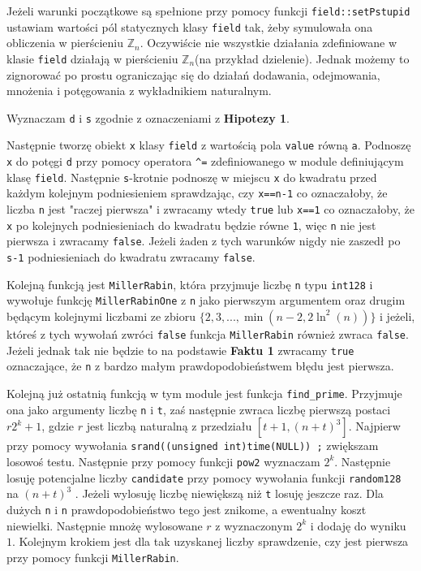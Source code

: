 \documentclass{article}
\begin{document}
Jeżeli warunki początkowe są spełnione przy pomocy funkcji \texttt{field::setPstupid} ustawiam wartości pól statycznych klasy 
\texttt{field} tak, żeby symulowała
ona obliczenia w pierścieniu $\mathbb{Z}_n$. Oczywiście nie wszystkie działania zdefiniowane
w klasie \texttt{field} działają w pierścieniu $\mathbb{Z}_n$(na przykład dzielenie). Jednak
możemy to zignorować po prostu ograniczając się do działań dodawania, odejmowania, mnożenia i potęgowania
z wykładnikiem naturalnym.

Wyznaczam \texttt{d} i \texttt{s} zgodnie z oznaczeniami z \textbf{Hipotezy 1}.

Następnie tworzę obiekt \texttt{x} klasy \texttt{field} z wartością pola \texttt{value} równą \texttt{a}.
Podnoszę \texttt{x} do potęgi \texttt{d} przy pomocy operatora \verb!^!\texttt{=} zdefiniowanego w module definiującym klasę \texttt{field}.
Następnie \texttt{s}-krotnie podnoszę w miejscu \texttt{x} do kwadratu przed każdym kolejnym podniesieniem sprawdzając, czy \texttt{x==n-1} 
co oznaczałoby, że liczba \texttt{n} jest "raczej pierwsza" i zwracamy wtedy \texttt{true} lub \texttt{x==1} co oznaczałoby, że \texttt{x} po kolejnych podniesieniach do kwadratu
będzie równe \texttt{1}, więc \texttt{n} nie jest pierwsza i zwracamy \texttt{false}. Jeżeli żaden z tych warunków nigdy nie zaszedł 
po \texttt{s-1} podniesieniach do kwadratu zwracamy \texttt{false}.

Kolejną funkcją jest \texttt{MillerRabin}, która przyjmuje liczbę \texttt{n} typu \texttt{\texttt{\textunderscore \textunderscore int128}} i 
wywołuje funkcję \texttt{MillerRabinOne} z \texttt{n} jako pierwszym argumentem oraz drugim będącym kolejnymi liczbami ze zbioru
$\{2,3,...,\min(n-2, 2\ln^2(n))\}$ i jeżeli, któreś z tych wywołań zwróci \texttt{false} funkcja \texttt{MillerRabin} również 
zwraca \texttt{false}. Jeżeli jednak tak nie będzie to na podstawie \textbf{Faktu 1} zwracamy \texttt{true} oznaczające, że 
\texttt{n} z bardzo małym prawdopodobieństwem błędu jest pierwsza. 

Kolejną już ostatnią funkcją w tym module jest funkcja \texttt{find\_prime}. Przyjmuje ona jako argumenty liczbę \texttt{n} i 
\texttt{t}, zaś następnie zwraca liczbę pierwszą postaci $r2^k+1$, gdzie $r$ jest liczbą naturalną z przedziału $[t+1,(n+t)^3]$.
Najpierw przy pomocy wywołania \texttt{srand((unsigned int)time(NULL)) ;} zwiększam losowoś testu. 
Następnie przy pomocy funkcji \texttt{pow2} wyznaczam $2^k$. Następnie losuję potencjalne liczby \texttt{candidate} przy pomocy wywołania
funkcji \texttt{random128} na $(n+t)^3$ . Jeżeli wylosuję liczbę niewiększą niż \texttt{t} losuję jeszcze raz. Dla dużych \texttt{n} i \texttt{n}
prawdopodobieństwo tego jest znikome, a ewentualny koszt niewielki. Następnie mnożę
wylosowane $r$ z wyznaczonym $2^k$ i dodaję do wyniku $1$. Kolejnym krokiem jest dla tak uzyskanej liczby sprawdzenie, czy 
jest pierwsza przy pomocy funkcji \texttt{MillerRabin}.
\end{document}
